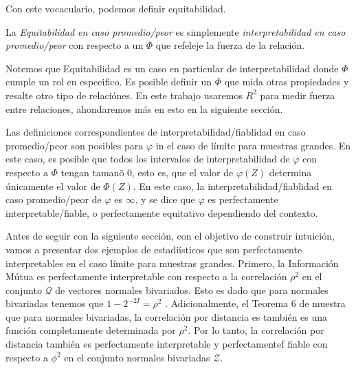 	Con este vocaculario, podemos definir equitabilidad.

	\begin{defn}
		La \textit{Equitabilidad en caso promedio/peor} es simplemente \textit{interpretabilidad en caso promedio/peor} con respecto a un $\Phi$ que refeleje la fuerza de la relaci\'on. 
	\end{defn}

	\begin{rem}
		Notemos que Equitabilidad es un caso en particular de interpretabilidad donde $\Phi$ cumple un rol en especifico. Es posible definir un $\Phi$ que mida otras propiedades y resalte otro tipo de relaci\'ones. En este trabajo usaremos $R^2$ para medir fuerza entre relaciones, ahondaremos m\'as en esto en la siguiente secci\'on.
	\end{rem}

	Las definiciones correspondientes de interpretabilidad/fiablidad en caso promedio/peor son posibles para $\varphi$ in el caso de l\'imite para muestras grandes. En este caso, es posible que todos los intervalos de interpretabilidad de $\varphi$ con respecto a $\Phi$ tengan taman\~o 0, esto es, que el valor de $\varphi(Z)$ determina \'unicamente el valor de $\Phi(Z)$. En este caso, la interpretabilidad/fiablidad en caso promedio/peor de $\varphi$ es $\infty$, y se dice que $\varphi$ es perfectamente interpretable/fiable, o perfectamente equitativo dependiendo del contexto.

	Antes de seguir con la siguiente secci\'on, con el objetivo de construir intuici\'on, vamos a presentar dos ejemplos de estadi\'isticos que son perfectamente interpretables en el caso 
	l\'imite para muestras grandes. Primero, la Informaci\'on M\'utua \cite{inftheo2006}\cite{inftheo2008} es perfectamente interpretable con respecto a la correlaci\'on $\rho^2$ en el conjunto $\mathcal{Q}$ de vectores normales bivariados. Esto es dado que para normales bivariadas tenemos que $1-2^{-2I} = \rho^2$ \cite{infcorr}. Adicionalmente, el Teorema 6 de \cite{Szekely2009} muestra que para normales bivariadas, la correlaci\'on por distancia es tambi\'en es una funci\'on completamente determinada por $\rho^2$. Por lo tanto, la correlaci\'on por distancia tambi\'en es perfectamente interpretable y perfectamentef fiable con respecto a $\phi^2$ en el conjunto normales bivariadas $\mathcal{Z}$.


